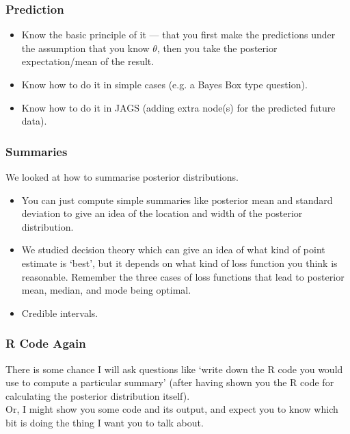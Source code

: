 \documentclass{beamer}
\begin{document}
\begin{frame}
\frametitle{Prediction}

\begin{itemize}
\item Know the basic principle of it --- that you first make the predictions
under the assumption that you know $\theta$, then you take the posterior
expectation/mean of the result. \pause
\item Know how to do it in simple cases (e.g. a Bayes Box type question).\pause
\item Know how to do it in JAGS (adding extra node(s) for the predicted future
data).
\end{itemize}



\end{frame}


\begin{frame}
\frametitle{Summaries}
We looked at how to summarise posterior distributions.

\begin{itemize}
\item You can just compute simple summaries like posterior mean and
standard deviation to give an idea of the location and width of the
posterior distribution.\pause
\item We studied decision theory which can give an idea of what kind of
point estimate is `best', but it depends on what kind of loss function you
think is reasonable. Remember the three cases of loss functions that
lead to posterior mean, median, and mode being optimal. \pause
\item Credible intervals.
\end{itemize}

\end{frame}


\begin{frame}
\frametitle{R Code Again}

There is some chance I will ask questions like `write down the R code you would
use to compute a particular summary' (after having shown you the R code for
calculating the posterior distribution itself).\pause\\[0.5em]

Or, I might show you some code and its output, and expect you to know which
bit is doing the thing I want you to talk about.
\end{frame}
\end{document}
